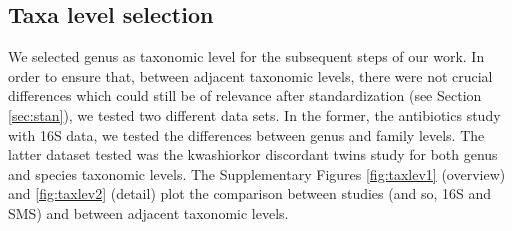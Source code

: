 \documentclass[12pt,oneside,letterpaper]{article}
\begin{document}
\subsection{Taxa level selection}
We selected genus as taxonomic level for the subsequent steps of our work. In order to ensure that, between adjacent taxonomic levels, there were not crucial differences which could still be of relevance after standardization (see Section \ref{sec:stan}), we tested two different data sets. In the former, the antibiotics study\cite{antibiotic} with 16S data, we tested the differences between genus and family levels. The latter dataset tested was the kwashiorkor discordant twins study\cite{kwashiorkor} for both genus and species taxonomic levels. The Supplementary Figures \ref{fig:taxlev1} (overview) and \ref{fig:taxlev2} (detail) plot the comparison between studies (and so, 16S and SMS) and between adjacent taxonomic levels.
\end{document}
